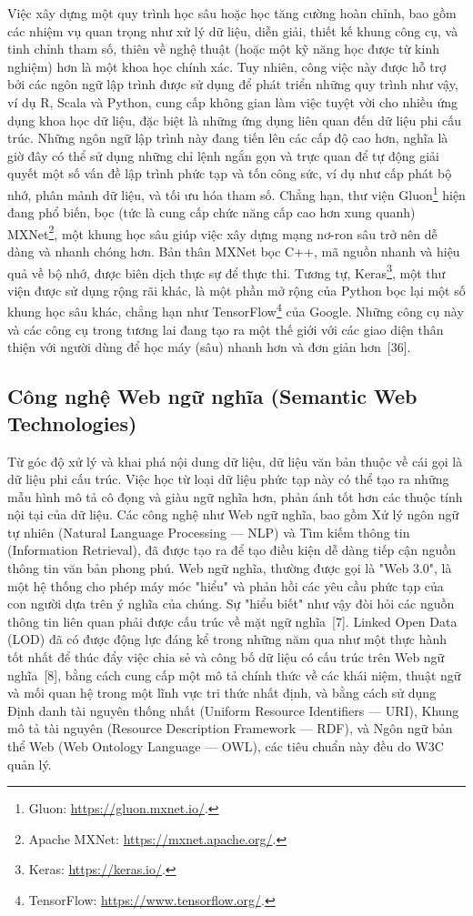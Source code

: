 Việc xây dựng một quy trình học sâu hoặc học tăng cường hoàn chỉnh, bao gồm các nhiệm vụ quan trọng như xử lý dữ liệu, diễn giải, thiết kế khung công cụ, và tinh chỉnh tham số, thiên về nghệ thuật (hoặc một kỹ năng học được từ kinh nghiệm) hơn là một khoa học chính xác. Tuy nhiên, công việc này được hỗ trợ bởi các ngôn ngữ lập trình được sử dụng để phát triển những quy trình như vậy, ví dụ R, Scala và Python, cung cấp không gian làm việc tuyệt vời cho nhiều ứng dụng khoa học dữ liệu, đặc biệt là những ứng dụng liên quan đến dữ liệu phi cấu trúc. Những ngôn ngữ lập trình này đang tiến lên các cấp độ cao hơn, nghĩa là giờ đây có thể sử dụng những chỉ lệnh ngắn gọn và trực quan để tự động giải quyết một số vấn đề lập trình phức tạp và tốn công sức, ví dụ như cấp phát bộ nhớ, phân mảnh dữ liệu, và tối ưu hóa tham số. Chẳng hạn, thư viện Gluon\footnote{Gluon: \url{https://gluon.mxnet.io/}.} hiện đang phổ biến, bọc (tức là cung cấp chức năng cấp cao hơn xung quanh) MXNet\footnote{Apache MXNet: \url{https://mxnet.apache.org/}.}, một khung học sâu giúp việc xây dựng mạng nơ-ron sâu trở nên dễ dàng và nhanh chóng hơn. Bản thân MXNet bọc C++, mã nguồn nhanh và hiệu quả về bộ nhớ, được biên dịch thực sự để thực thi. Tương tự, Keras\footnote{Keras: \url{https://keras.io/}.}, một thư viện được sử dụng rộng rãi khác, là một phần mở rộng của Python bọc lại một số khung học sâu khác, chẳng hạn như TensorFlow\footnote{TensorFlow: \url{https://www.tensorflow.org/}.} của Google. Những công cụ này và các công cụ trong tương lai đang tạo ra một thế giới với các giao diện thân thiện với người dùng để học máy (sâu) nhanh hơn và đơn giản hơn~[36].

\subsection{Công nghệ Web ngữ nghĩa (Semantic Web Technologies)}

Từ góc độ xử lý và khai phá nội dung dữ liệu, dữ liệu văn bản thuộc về cái gọi là dữ liệu phi cấu trúc. Việc học từ loại dữ liệu phức tạp này có thể tạo ra những mẫu hình mô tả cô đọng và giàu ngữ nghĩa hơn, phản ánh tốt hơn các thuộc tính nội tại của dữ liệu. Các công nghệ như Web ngữ nghĩa, bao gồm Xử lý ngôn ngữ tự nhiên (Natural Language Processing — NLP) và Tìm kiếm thông tin (Information Retrieval), đã được tạo ra để tạo điều kiện dễ dàng tiếp cận nguồn thông tin văn bản phong phú. Web ngữ nghĩa, thường được gọi là "Web 3.0", là một hệ thống cho phép máy móc "hiểu" và phản hồi các yêu cầu phức tạp của con người dựa trên ý nghĩa của chúng. Sự "hiểu biết" như vậy đòi hỏi các nguồn thông tin liên quan phải được cấu trúc về mặt ngữ nghĩa~[7]. Linked Open Data (LOD) đã có được động lực đáng kể trong những năm qua như một thực hành tốt nhất để thúc đẩy việc chia sẻ và công bố dữ liệu có cấu trúc trên Web ngữ nghĩa~[8], bằng cách cung cấp một mô tả chính thức về các khái niệm, thuật ngữ và mối quan hệ trong một lĩnh vực tri thức nhất định, và bằng cách sử dụng Định danh tài nguyên thống nhất (Uniform Resource Identifiers — URI), Khung mô tả tài nguyên (Resource Description Framework — RDF), và Ngôn ngữ bản thể Web (Web Ontology Language — OWL), các tiêu chuẩn này đều do W3C quản lý.

